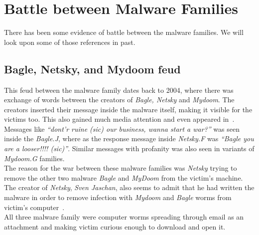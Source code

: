 \section{Battle between Malware Families}
\label{sec:Battle between Malware Families}
There has been some evidence of battle between the malware families. We will look upon some of those references in past.
\subsection{Bagle, Netsky, and Mydoom feud}
\label{sub:Bagle, Netsky, and Mydoom feud}
This feud between the malware family dates back to 2004, where there was exchange of words between the creators of \emph{Bagle, Netsky} and \emph{Mydoom}.
The creators inserted their message inside the malware itself, making it visible for the victims too. This also gained much media attention and even appeared in~\cite[BBC]{bbccover}.
Messages like \emph{``dont'r ruine (sic) our business, wanna start a war?''} was seen inside the \emph{Bagle.J}, where as the response message inside \emph{Netsky.F} was \emph{``Bagle \- you are a looser!!!! (sic)''}.
Similar messages with profanity was also seen in variants of \emph{Mydoom.G} families.\\
The reason for the war between these malware families was \emph{Netsky} trying to remove the other two malware \emph{Bagle} and \emph{MyDoom} from the victim's machine.
The creator of \emph{Netsky}, \emph{Sven Jaschan}, also seems to admit that he had written the malware in order to remove infection with \emph{Mydoom} and \emph{Bagle} worms from victim's computer~\cite[]{wikinetsky}.\\
All three malware family were computer worms spreading through email as an attachment and making victim curious enough to download and open it.





